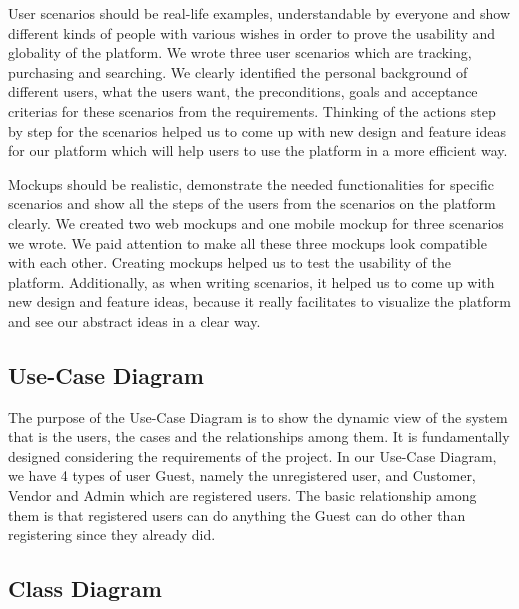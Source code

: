 \documentclass[]{article}
\begin{document}
User scenarios should be real-life examples, understandable by everyone
and show different kinds of people with various wishes in order to prove
the usability and globality of the platform. We wrote three user
scenarios which are tracking, purchasing and searching. We clearly
identified the personal background of different users, what the users
want, the preconditions, goals and acceptance criterias for these
scenarios from the requirements. Thinking of the actions step by step
for the scenarios helped us to come up with new design and feature ideas
for our platform which will help users to use the platform in a more
efficient way.

Mockups should be realistic, demonstrate the needed functionalities for
specific scenarios and show all the steps of the users from the
scenarios on the platform clearly. We created two web mockups and one
mobile mockup for three scenarios we wrote. We paid attention to make
all these three mockups look compatible with each other. Creating
mockups helped us to test the usability of the platform. Additionally,
as when writing scenarios, it helped us to come up with new design and
feature ideas, because it really facilitates to visualize the platform
and see our abstract ideas in a clear way.

\hypertarget{use-case-diagram}{%
    \subsection{Use-Case Diagram}\label{use-case-diagram}}

The purpose of the Use-Case Diagram is to show the dynamic view of the
system that is the users, the cases and the relationships among them. It
is fundamentally designed considering the requirements of the project.
In our Use-Case Diagram, we have 4 types of user Guest, namely the
unregistered user, and Customer, Vendor and Admin which are registered
users. The basic relationship among them is that registered users can do
anything the Guest can do other than registering since they already did.

\hypertarget{class-diagram}{%
    \subsection{Class Diagram}\label{class-diagram}}
\end{document}
